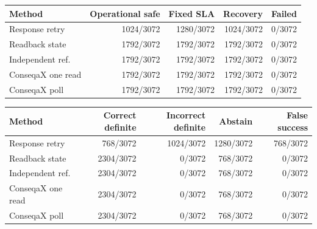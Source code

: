 \begin{tabular}{lrrrr}
Method & Operational safe & Fixed SLA & Recovery & Failed \\
\hline
Response retry & 1024/3072 & 1280/3072 & 1024/3072 & 0/3072 \\
Readback state & 1792/3072 & 1792/3072 & 1792/3072 & 0/3072 \\
Independent ref. & 1792/3072 & 1792/3072 & 1792/3072 & 0/3072 \\
ConseqaX one read & 1792/3072 & 1792/3072 & 1792/3072 & 0/3072 \\
ConseqaX poll & 1792/3072 & 1792/3072 & 1792/3072 & 0/3072 \\
\end{tabular}

\begin{tabular}{lrrrr}
Method & Correct definite & Incorrect definite & Abstain & False success \\
\hline
Response retry & 768/3072 & 1024/3072 & 1280/3072 & 768/3072 \\
Readback state & 2304/3072 & 0/3072 & 768/3072 & 0/3072 \\
Independent ref. & 2304/3072 & 0/3072 & 768/3072 & 0/3072 \\
ConseqaX one read & 2304/3072 & 0/3072 & 768/3072 & 0/3072 \\
ConseqaX poll & 2304/3072 & 0/3072 & 768/3072 & 0/3072 \\
\end{tabular}
